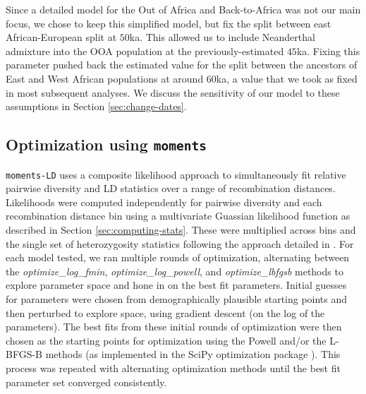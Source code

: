\documentclass[]{article}
\newcommand{\sgcomment}[1]{{\textcolor{red}{SG: #1}}}
\newcommand{\moments}{\texttt{moments}\xspace}
\begin{document}
Since a detailed model for the Out of Africa and Back-to-Africa was not our
main focus, we chose to keep this simplified model, but fix the split between
east African-European split at $50$ka. This allowed us to include Neanderthal
admixture into the OOA population at the previously-estimated $45$ka. Fixing
this parameter pushed back the estimated value for the split between the
ancestors of East and West African populations at around $60$ka, a value that
we took as fixed in most subsequent analyses. 
We discuss the sensitivity of our model to these assumptions in Section
\ref{sec:change-dates}.

%
%

\subsection{Optimization using \moments}

\texttt{moments-LD} uses a composite likelihood approach to simultaneously fit relative
pairwise diversity and LD statistics over a range of recombination distances.
Likelihoods were computed independently for pairwise diversity and each
recombination distance bin using a multivariate Guassian likelihood function as
described in Section \ref{sec:computing-stats}. These were multiplied across
bins and the single set of heterozygosity statistics following the approach
detailed in \citet{Ragsdale2019-nt}. For each model tested, we ran multiple
rounds of optimization, alternating between the \emph{optimize\_log\_fmin},
\emph{optimize\_log\_powell}, and \emph{optimize\_lbfgsb} methods to explore
parameter space and hone in on the best fit parameters. Initial guesses for
parameters were chosen from demographically plausible starting points and then
perturbed to explore space, using gradient descent (on the log of the
parameters). The best fits from these initial rounds of optimization were then
chosen as the starting points for optimization using the Powell and/or the
L-BFGS-B methods (as implemented in the SciPy optimization package
\citep{Virtanen2020-kr}). This process was repeated with alternating
optimization methods until the best fit parameter set converged consistently.
\end{document}
